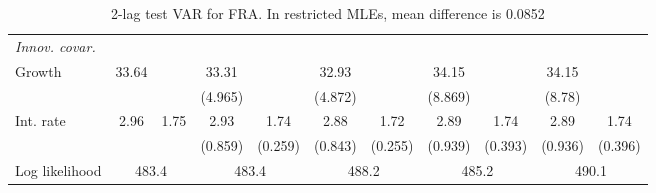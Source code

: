 \begin{table}[htbp]
\begin{tabular}{@{\extracolsep{4pt}}lcccccccccc@{}}
\rule{0pt}{4ex} \emph{Innov. covar.}  	 & 	 & 	 & 	 & 	 & 	 & 	 & 	 & 	 & 	 &\\ 
\quad Growth 	 &33.64 	 &  	 & 33.31 	 &  	 & 32.93 	 &  	 & 34.15 	 &  	 & 34.15 	 & 	 \\ 
 		 &  	 &  	 & (4.965) 	 &  	 & (4.872) 	 &  	 & (8.869) 	 &  	 & (8.78) 	 &  	 \\ 
\quad Int. rate 	 &2.96 	 & 1.75 	 & 2.93 	 & 1.74 	 & 2.88 	 & 1.72 	 & 2.89 	 & 1.74 	 & 2.89 	 & 1.74	 \\ 
 		 &  	 &  	 & (0.859) 	 & (0.259) 	 & (0.843) 	 & (0.255) 	 & (0.939) 	 & (0.393) 	 & (0.936) 	 & (0.396) 	 \\ 
 \hline \rule{0pt}{4ex} 
  Log likelihood 	 &\multicolumn{2}{c}{483.4} 	 & \multicolumn{2}{c}{483.4} 	 & \multicolumn{2}{c}{488.2} 	 & \multicolumn{2}{c}{485.2} 	 & \multicolumn{2}{c}{490.1}\\ 

 \hline 	\end{tabular}		\caption{2-lag test VAR for FRA. In restricted MLEs, mean difference is 0.0852}
		\label{tab:FRA2lag}

\end{table}